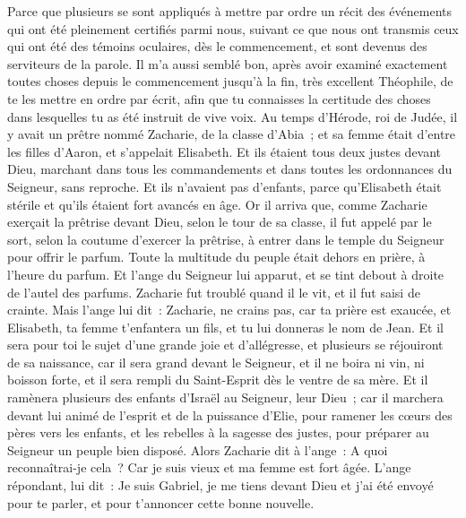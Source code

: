 \begin{multicols}{2}
\VerseOne{}Parce que plusieurs se sont appliqués à mettre par ordre un récit des événements qui ont été pleinement certifiés parmi nous,
suivant ce que nous ont transmis ceux qui ont été des témoins oculaires, dès le commencement, et sont devenus des serviteurs de la parole.
Il m'a aussi semblé bon, après avoir examiné exactement toutes choses depuis le commencement jusqu'à la fin, très excellent Théophile, de te les mettre en ordre par écrit,
afin que tu connaisses la certitude des choses dans lesquelles tu as été instruit de vive voix.
Au temps d'Hérode, roi de Judée, il y avait un prêtre nommé Zacharie, de la classe d'Abia~; et sa femme était d'entre les filles d'Aaron, et s'appelait Elisabeth.
Et ils étaient tous deux justes devant Dieu, marchant dans tous les commandements et dans toutes les ordonnances du Seigneur, sans reproche.
Et ils n'avaient pas d'enfants, parce qu'Elisabeth était stérile et qu'ils étaient fort avancés en âge.
Or il arriva que, comme Zacharie exerçait la prêtrise devant Dieu, selon le tour de sa classe, il fut appelé par le sort,
selon la coutume d'exercer la prêtrise, à entrer dans le temple du Seigneur pour offrir le parfum.
Toute la multitude du peuple était dehors en prière, à l'heure du parfum.
Et l'ange du Seigneur lui apparut, et se tint debout à droite de l'autel des parfums.
Zacharie fut troublé quand il le vit, et il fut saisi de crainte.
Mais l'ange lui dit~: Zacharie, ne crains pas, car ta prière est exaucée, et Elisabeth, ta femme t'enfantera un fils, et tu lui donneras le nom de Jean.
Et il sera pour toi le sujet d'une grande joie et d'allégresse, et plusieurs se réjouiront de sa naissance,
car il sera grand devant le Seigneur, et il ne boira ni vin, ni boisson forte, et il sera rempli du Saint-Esprit dès le ventre de sa mère.
Et il ramènera plusieurs des enfants d'Israël au Seigneur, leur Dieu~;
car il marchera devant lui animé de l'esprit et de la puissance d'Elie, pour ramener les cœurs des pères vers les enfants, et les rebelles à la sagesse des justes, pour préparer au Seigneur un peuple bien disposé.
Alors Zacharie dit à l'ange~: A quoi reconnaîtrai-je cela~? Car je suis vieux et ma femme est fort âgée.
L'ange répondant, lui dit~: Je suis Gabriel, je me tiens devant Dieu et j'ai été envoyé pour te parler, et pour t'annoncer cette bonne nouvelle.

\end{multicols}

